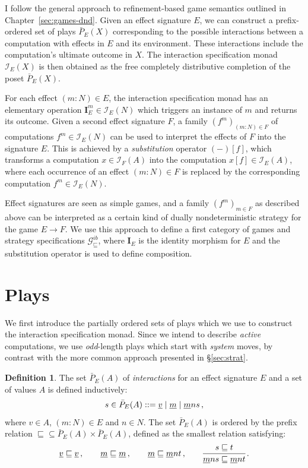 \documentclass[11pt,oneside,draft]{book}
\theoremstyle{definition}
\newtheorem{definition}[theorem]{Definition}
\newcommand{\gcat}{\mathcal{G}_{\sqsubseteq}}
\newcommand{\ul}[1]{%
  \underline{\smash{#1}}
}
\begin{document}
I follow the general approach
to refinement-based game semantics
outlined in Chapter~\ref{sec:games-dnd}.
Given an effect signature $E$,
we can construct a prefix-ordered set of plays $\bar{P}_E(X)$
corresponding to the possible interactions between
a computation with effects in $E$
and its environment.
These interactions include the computation's ultimate outcome in $X$.
The interaction specification monad $\mathcal{I}_E(X)$ is then obtained
as the free completely distributive completion of the poset $\bar{P}_E(X)$.

For each effect $(m \mathbin: N) \in E$,
the interaction specification monad
has an elementary operation
$\mathbf{I}_E^m \in \mathcal{I}_E(N)$
which triggers an instance of $m$ and returns its outcome.
Given a second effect signature $F$,
a family $(f^m)_{(m \mathbin: N) \in F}$ of computations
$f^m \in \mathcal{I}_E(N)$
can be used to interpret the effects of $F$
into the signature $E$.
This is achieved by a \emph{substitution} operator $(-)[f]$,
which transforms a computation $x \in \mathcal{I}_F(A)$
into the computation $x[f] \in \mathcal{I}_E(A)$,
where each occurrence of an effect $(m \mathbin: N) \in F$
is replaced by the corresponding computation $f^m \in \mathcal{I}_E(N)$.

Effect signatures are seen as
simple games,
and a family $(f^m)_{m \in F}$ as described above
can be interpreted as
a certain kind of
dually nondeterministic strategy for the game $E \rightarrow F$.
We use this approach to define
a first category of games and strategy specifications $\gcat^{ib}$,
where $\mathbf{I}_E$ is %
the identity morphism for $E$ and
the substitution operator
is used to define composition.


\section{Plays} \label{sec:intm:plays} %

We first introduce the partially ordered sets of plays
which we use to construct the interaction specification monad.
Since we intend to describe \emph{active} computations,
we use \emph{odd}-length plays which start with \emph{system} moves,
by contrast with the more common approach
presented in \S\ref{sec:strat}.

\begin{definition}
The set $\bar{P}_E(A)$ of \emph{interactions}
for an effect signature $E$ and a set of values $A$
is defined inductively:
\[
  s \in \bar{P}_E(A) ::=
    \ul{v} \mid
    \ul{m} \mid
    \ul{m} n s \,,
\]
where $v \in A$, $(m \mathbin: N) \in E$ and $n \in N$.
The set $\bar{P}_E(A)$ is ordered by the prefix relation
${\sqsubseteq} \subseteq \bar{P}_E(A) \times \bar{P}_E(A)$,
defined
as the smallest relation satisfying:
\[
  \ul{v} \sqsubseteq \ul{v} \,, \qquad
  \ul{m} \sqsubseteq \ul{m} \,, \qquad
  \ul{m} \sqsubseteq \ul{m} n t \,, \qquad
  \begin{prooftree}
    \hypo{s \sqsubseteq t}
    \infer1{\ul{m} n s \sqsubseteq \ul{m} n t}
  \end{prooftree} \,.
\]
\end{definition}
\end{document}
